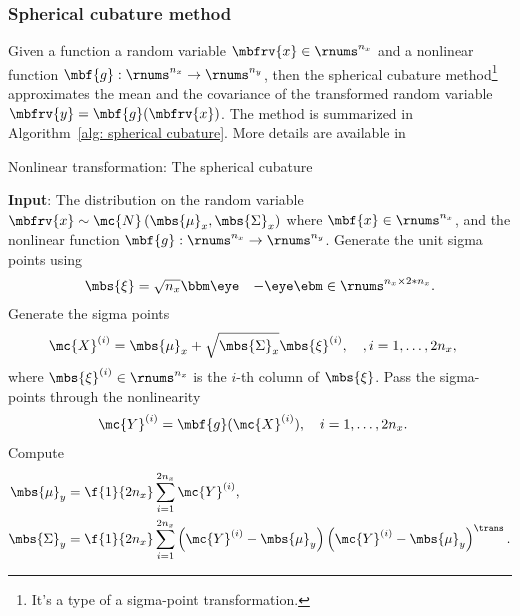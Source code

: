 \subsubsection{Spherical cubature method}
Given a function a random variable $\mbfrv{x}\in\rnums^{n_{x}}$ and a nonlinear function $\mbf{g}:\rnums^{n_{x}}\to\rnums^{n_{y}}$, then the spherical cubature method\footnote{It's a type of a sigma-point transformation.} approximates the mean and the covariance of the transformed random variable $\mbfrv{y}=\mbf{g}(\mbfrv{x})$. The method is summarized in Algorithm~\ref{alg: spherical cubature}. More details are available in \cite{sarkka_bayesian_2013}


\begin{algorithm}[H]
    \caption{Nonlinear transformation: The spherical cubature}
    \label{alg: spherical cubature}
    \begin{algorithmic}[1]
        \State \textbf{Input}: The distribution on the random variable $\mbfrv{x}\sim\mc{N}\left( \mbs{\mu}_{x},\mbs{\Sigma}_{x} \right)$ where $\mbf{x}\in\rnums^{n_{x}}$, and the nonlinear function $\mbf{g}:\rnums^{n_{x}}\to\rnums^{n_{y}}$.
        \State Generate the unit sigma points using
        \begin{align}
            \mbs{\xi} &= \sqrt{n_{x}} \bbm \eye&-\eye \ebm\in\rnums^{n_{x} \times 2*n_{x}}.
        \end{align}
        \State Generate the sigma points
        \begin{align}
            \mc{X}^{(i)} &= \mbs{\mu}_{x} + \sqrt{\mbs{\Sigma}_{x}}\mbs{\xi}^{(i)}, \quad, i=1,\ldots, 2n_{x},
        \end{align}
        where $\mbs{\xi}^{(i)}\in\rnums^{n_{x}}$ is the $i$-th column of $\mbs{\xi}$.
        \State Pass the sigma-points through the nonlinearity
        \begin{align}
            \mc{Y}^{(i)} &= \mbf{g}(\mc{X}^{(i)}), \quad i=1, \ldots, 2n_{x}.
        \end{align}
        \State Compute
        \begin{align}
            \mbs{\mu}_{y} &= \f{1}{2n_{x}}\sum_{i=1}^{2n_{x}}\mc{Y}^{(i)},\\
            \mbs{\Sigma}_{y} &= \f{1}{2n_{x}}\sum_{i=1}^{2n_{x}}\left( \mc{Y}^{(i)}-\mbs{\mu}_{y} \right)\left( \mc{Y}^{(i)}-\mbs{\mu}_{y} \right)^{\trans}.
        \end{align}
    \end{algorithmic}
\end{algorithm}




